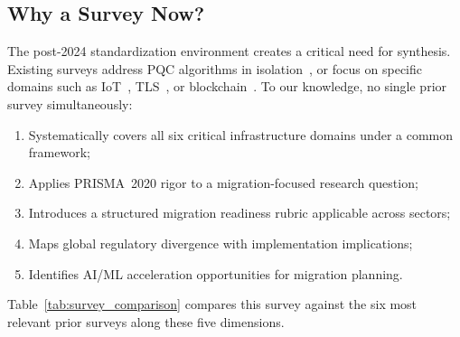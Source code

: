 \documentclass[journal]{IEEEtran}
\begin{document}
\subsection{Why a Survey Now?}

The post-2024 standardization environment creates a critical need for synthesis.
Existing surveys address PQC algorithms in isolation~\cite{bernstein2017postquantum,
nejatollahi2019post}, or focus on specific domains such as IoT~\cite{liu2021pqc},
TLS~\cite{stebila2020postquantum}, or blockchain~\cite{fernandezcarames2020review}.
To our knowledge, no single prior survey simultaneously:
\begin{enumerate}
  \item Systematically covers all six critical infrastructure domains under a common framework;
  \item Applies PRISMA~2020 rigor to a migration-focused research question;
  \item Introduces a structured migration readiness rubric applicable across sectors;
  \item Maps global regulatory divergence with implementation implications;
  \item Identifies AI/ML acceleration opportunities for migration planning.
\end{enumerate}

Table~\ref{tab:survey_comparison} compares this survey against the six most
relevant prior surveys along these five dimensions.
\end{document}
